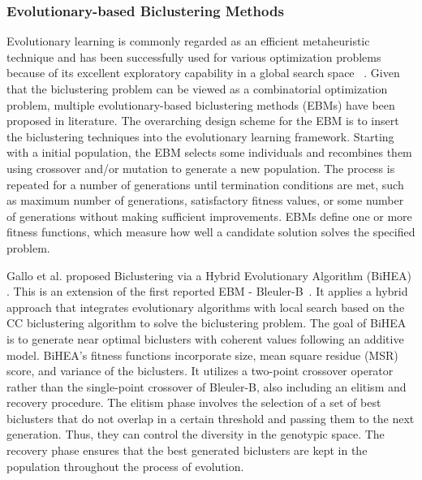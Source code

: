  
\subsubsection*{Evolutionary-based Biclustering Methods }

Evolutionary learning is commonly regarded as an efficient metaheuristic technique and has been successfully used for various optimization problems because of its excellent exploratory capability in a global search space ~\cite{huang2012parallelized}.
Given that the biclustering problem can be viewed as a combinatorial optimization problem, multiple evolutionary-based biclustering methods (EBMs) have been proposed in literature.
The overarching design scheme for the EBM is to insert the biclustering techniques into the evolutionary learning framework.
Starting with a initial population, the EBM selects some individuals and recombines them using crossover and/or mutation to generate a new population.
The process is repeated for a number of generations until termination conditions are met, such as maximum number of generations, satisfactory fitness values, or some number of generations without making sufficient improvements.
EBMs define one or more fitness functions, which measure how well a candidate solution solves the specified problem.

Gallo et al. proposed Biclustering via a Hybrid Evolutionary Algorithm (BiHEA) \cite{gallo2009bihea}. This is an extension of the first reported EBM - Bleuler-B~\cite{bleuler2004ea}.
It applies a hybrid approach that integrates evolutionary algorithms with local search based on the CC biclustering algorithm \cite{cheng2000biclustering} to solve the biclustering problem.
The goal of BiHEA is to generate near optimal biclusters with coherent values following an additive model.
BiHEA's fitness functions incorporate size, mean square residue (MSR) score, and variance of the biclusters.
It utilizes a two-point crossover operator rather than the single-point crossover of Bleuler-B, also including an elitism and recovery procedure.
The elitism phase involves the selection of a set of best biclusters that do not overlap in a certain threshold and passing them to the next generation.
Thus, they can control the diversity in the genotypic space.
The recovery phase ensures that the best generated biclusters are kept in the population throughout the process of evolution.
 
